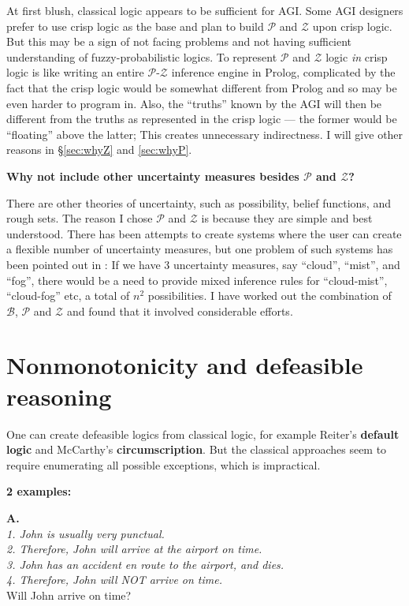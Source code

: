 At first blush, classical logic appears to be sufficient for AGI.  Some AGI designers prefer to use crisp logic as the base and plan to build $\mathcal{P}$ and $\mathcal{Z}$ upon crisp logic.  But this may be a sign of not facing problems and not having sufficient understanding of fuzzy-probabilistic logics.  To represent $\mathcal{P}$ and $\mathcal{Z}$ logic \textit{in} crisp logic is like writing an entire $\mathcal{P}$-$\mathcal{Z}$ inference engine in Prolog, complicated by the fact that the crisp logic would be somewhat different from Prolog and so may be even harder to program in.  Also, the ``truths'' known by the AGI will then be different from the truths as represented in the crisp logic --- the former would be ``floating'' above the latter;  This creates unnecessary indirectness.  I will give other reasons in \S\ref{sec:whyZ} and \ref{sec:whyP}.

\textbf{Why not include other uncertainty measures besides $\mathcal{P}$ and $\mathcal{Z}$?}

There are other theories of uncertainty, such as possibility, belief functions, and rough sets.  The reason I chose $\mathcal{P}$ and $\mathcal{Z}$ is because they are simple and best understood.  There has been attempts to create systems where the user can create a flexible number of uncertainty measures, but one problem of such systems has been pointed out in \citep*{Parsons2001}:  If we have 3 uncertainty measures, say ``cloud'', ``mist'', and ``fog'', there would be a need to provide mixed inference rules for ``cloud-mist'', ``cloud-fog'' etc, a total of $n^2$ possibilities.  I have worked out the combination of $\mathcal{B}$, $\mathcal{P}$ and $\mathcal{Z}$ and found that it involved considerable efforts.

\section{Nonmonotonicity and defeasible reasoning}
\label{sec:exceptions}

One can create defeasible logics from classical logic, for example Reiter's \textbf{default logic} and McCarthy's \textbf{circumscription}.  But the classical approaches seem to require enumerating all possible exceptions, which is impractical.

\textbf{2 examples:}

\textbf{A.}\\
\textit{
1. John is usually very punctual.\\
2. Therefore, John will arrive at the airport on time.\\
3. John has an accident en route to the airport, and dies.\\
4. Therefore, John will NOT arrive on time.\\}
Will John arrive on time?

